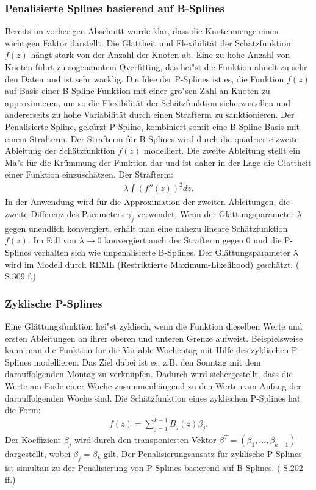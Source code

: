 \documentclass[12pt]{scrreprt}
\begin{document}
\subsubsection{Penalisierte Splines basierend auf B-Splines}
Bereits im vorherigen Abschnitt wurde klar, dass die Knotenmenge einen wichtigen Faktor darstellt. Die Glattheit und Flexibilität der Schätzfunktion $f(z)$ hängt stark von der Anzahl der Knoten ab. Eine zu hohe Anzahl von Knoten führt zu sogenanntem \glqq Overfitting\grqq, das hei"st die Funktion ähnelt zu sehr den Daten und ist sehr wacklig. Die Idee der P-Splines ist es, die Funktion $f(z)$ auf Basis einer B-Spline Funktion mit einer gro"sen Zahl an Knoten zu approximieren, um so die Flexibilität der Schätzfunktion sicherzustellen und andererseits zu hohe Variabilität durch einen Strafterm zu sanktionieren. Der Penalisierte-Spline, gekürzt P-Spline, kombiniert somit eine B-Spline-Basis mit einem Strafterm. Der Strafterm für B-Splines wird durch die quadrierte zweite Ableitung der Schätzfunktion $f(z)$ modelliert. Die zweite Ableitung stellt ein Ma"s für die Krümmung der Funktion dar und ist daher in der Lage die Glattheit einer Funktion einzuschätzen.
Der Strafterm: 
\begin{align}
\lambda\int(f''(z))^2dz.
\end{align}
In der Anwendung wird für die Approximation der zweiten Ableitungen, die zweite Differenz des Parameters $\gamma_{j}$ verwendet. Wenn der Glättungsparameter $\lambda$ gegen unendlich konvergiert, erhält man eine nahezu lineare Schätzfunktion $f(z)$. Im Fall von $\lambda \to 0$ konvergiert auch der Strafterm gegen $0$ und die P-Splines verhalten sich wie unpenalisierte B-Splines. Der Glättungsparameter $\lambda$ wird im Modell durch REML (Restriktierte Maximum-Likelihood) geschätzt. (\cite{fahrmeir2007regression} S.309 f.)

\subsubsection{Zyklische P-Splines}
Eine Glättungsfunktion hei"st zyklisch, wenn die Funktion dieselben Werte und ersten Ableitungen an ihrer oberen und unteren Grenze aufweist. Beispielsweise kann man die Funktion für die Variable Wochentag mit Hilfe des zyklischen P-Splines modellieren. Das Ziel dabei ist es, z.B. den Sonntag mit dem darauffolgenden Montag zu verknüpfen. Dadurch wird sichergestellt, dass die Werte am Ende einer Woche zusammenhängend zu den Werten am Anfang der darauffolgenden Woche sind. 
Die Schätzfunktion eines zyklischen P-Splines hat die Form:
\begin{align}
f(z)=\sum_{j=1}^{k-1}B_{j}(z)\beta_{j}.
\end{align}
Der Koeffizient $\beta_{j}$ wird durch den transponierten Vektor $\beta^T=(\beta_{1},...,\beta_{k-1})$ dargestellt, wobei $\beta_{j}=\beta_{k}$ gilt.
Der Penalisierungsansatz für zyklische P-Splines ist simultan zu der Penalisierung von P-Splines basierend auf B-Splines. (\cite{wood2017generalized} S.202 ff.)
\end{document}
